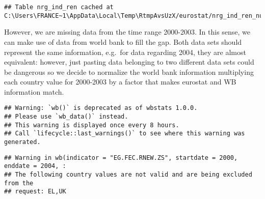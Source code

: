 \documentclass[
]{article}
\newenvironment{Shaded}{\begin{snugshade}}{\end{snugshade}}
\newcommand{\DataTypeTok}[1]{\textcolor[rgb]{0.13,0.29,0.53}{#1}}
\newcommand{\DecValTok}[1]{\textcolor[rgb]{0.00,0.00,0.81}{#1}}
\newcommand{\KeywordTok}[1]{\textcolor[rgb]{0.13,0.29,0.53}{\textbf{#1}}}
\newcommand{\NormalTok}[1]{#1}
\newcommand{\OperatorTok}[1]{\textcolor[rgb]{0.81,0.36,0.00}{\textbf{#1}}}
\newcommand{\StringTok}[1]{\textcolor[rgb]{0.31,0.60,0.02}{#1}}
\begin{document}
\begin{verbatim}
## Table nrg_ind_ren cached at C:\Users\FRANCE~1\AppData\Local\Temp\RtmpAvsUzX/eurostat/nrg_ind_ren_num_code_FF.rds
\end{verbatim}

\begin{Shaded}
\end{Shaded}

However, we are missing data from the time range 2000-2003. In this
sense, we can make use of data from world bank to fill the gap. Both
data sets should represent the same information, e.g.~for data regarding
2004, they are almost equivalent: however, just pasting data belonging
to two different data sets could be dangerous so we decide to normalize
the world bank information multiplying each country value for 2000-2003
by a factor that makes eurostat and WB information match.

\begin{Shaded}
\end{Shaded}

\begin{verbatim}
## Warning: `wb()` is deprecated as of wbstats 1.0.0.
## Please use `wb_data()` instead.
## This warning is displayed once every 8 hours.
## Call `lifecycle::last_warnings()` to see where this warning was generated.
\end{verbatim}

\begin{verbatim}
## Warning in wb(indicator = "EG.FEC.RNEW.ZS", startdate = 2000, enddate = 2004, :
## The following country values are not valid and are being excluded from the
## request: EL,UK
\end{verbatim}
\end{document}
